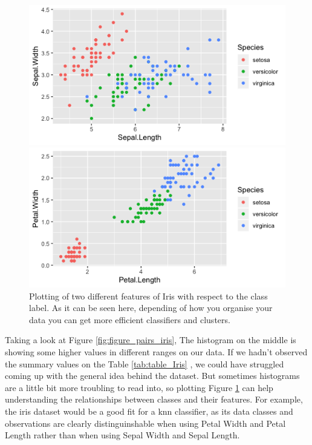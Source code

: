\documentclass[12pt]{report}
\begin{document}
\begin{figure}[H]
\begin{minipage}{.5\textwidth}
        \includegraphics[scale=.54]{Figuras_tfg/R_plot_iris_knn_width_sepal}
 \end{minipage}%
 \begin{minipage}{.5\textwidth}
        \begin{flushright}
               \includegraphics[scale=.54]{Figuras_tfg/R_plot_knn_petal}  
        \end{flushright} 
    \end{minipage}  
  \caption{Plotting of two different features of Iris with respect to the class label. As it can be seen here, depending of how you organise your data you can get more efficient classifiers and clusters. }
 \label{fig:figure_knn_classifier}
\end{figure} 

Taking a look at Figure \ref{fig:figure_pairs_iris}, The histogram on the middle is showing some higher values in different ranges on our data. If we hadn't observed the summary values on the Table \ref{tab:table_Iris} , we could have struggled coming up with the general idea behind the dataset. But sometimes histograms are a little bit more troubling to read into, so plotting Figure \ref{fig:figure_knn_classifier} can help understanding the relationships between classes and their features. For example, the iris dataset would be a good fit for a knn classifier, as its data classes and observations are clearly distinguinshable when using Petal Width and Petal Length rather than when using Sepal Width and Sepal Length. \par
\end{document}
